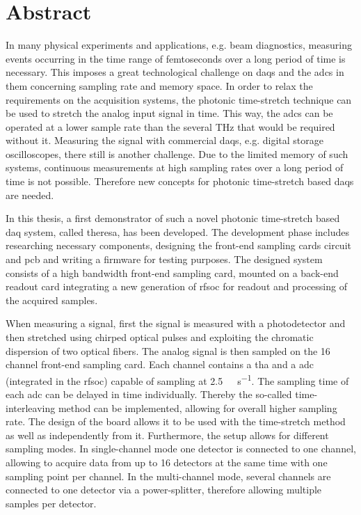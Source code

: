 \chapter*{Abstract}
In many physical experiments and applications, e.g. beam diagnostics, measuring events occurring in the time range of femtoseconds over a long period of time is necessary. 
This imposes a great technological challenge on \glspl{daq} and the \glspl{adc} in them concerning sampling rate and memory space.
In order to relax the requirements on the acquisition systems, the photonic time-stretch technique can be used to stretch the analog input signal in time.
This way, the \glspl{adc} can be operated at a lower sample rate than the several \si{\THz} that would be required without it. 
Measuring the signal with commercial \glspl{daq}, e.g. digital storage oscilloscopes, there still is another challenge.
Due to the limited memory of such systems, continuous measurements at high sampling rates over a long period of time is not possible.
Therefore new concepts for photonic time-stretch based \glspl{daq} are needed.

In this thesis, a first demonstrator of such a novel photonic time-stretch based \gls{daq} system, called \gls{theresa}, has been developed.
The development phase includes researching necessary components, designing the front-end sampling cards circuit and \gls{pcb} and writing a firmware for testing purposes.
The designed system consists of a high bandwidth front-end sampling card, mounted on a back-end readout card integrating a new generation of \gls{rfsoc} for readout and processing of the acquired samples.

When measuring a signal, first the signal is measured with a photodetector and then stretched using chirped optical pulses and exploiting the chromatic dispersion of two optical fibers.
The analog signal is then sampled on the 16 channel front-end sampling card.
Each channel contains a \gls{tha} and a \gls{adc} (integrated in the \gls{rfsoc}) capable of sampling at \SI{2.5}{\giga \sample \per \second}.
The sampling time of each \gls{adc} can be delayed in time individually. 
Thereby the so-called time-interleaving method can be implemented, allowing for overall higher sampling rate.
The design of the board allows it to be used with the time-stretch method as well as independently from it.
Furthermore, the setup allows for different sampling modes.
In single-channel mode one detector is connected to one channel, allowing to acquire data from up to 16 detectors at the same time with one sampling point per channel.
In the multi-channel mode, several channels are connected to one detector via a power-splitter, therefore allowing multiple samples per detector. %

